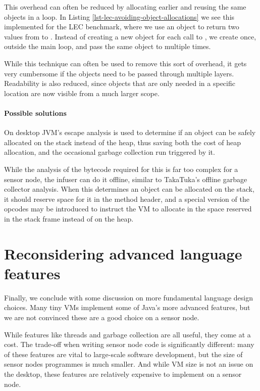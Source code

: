 This overhead can often be reduced by allocating earlier and reusing the same objects in a loop. In Listing \ref{lst-lec-avoiding-object-allocations} we see this implemented for the LEC benchmark, where we use an object to return two values from  to . Instead of creating a new object for each call to , we create  once, outside the main loop, and pass the same object to  multiple times.

While this technique can often be used to remove this sort of overhead, it gets very cumbersome if the objects need to be passed through multiple layers. Readability is also reduced, since objects that are only needed in a specific location are now visible from a much larger scope.

\paragraph{Possible solutions}
On desktop JVM's escape analysis \cite{Choi:1999uw, Goetz:2005uy} is used to determine if an object can be safely allocated on the stack instead of the heap, thus saving both the cost of heap allocation, and the occasional garbage collection run triggered by it.

While the analysis of the bytecode required for this is far too complex for a sensor node, the infuser can do it offline, similar to TakaTuka's offline garbage collector analysis. When this determines an object can be allocated on the stack, it should reserve space for it in the method header, and a special version of the  opcodes may be introduced to instruct the VM to allocate in the space reserved in the stack frame instead of on the heap.




\section{Reconsidering advanced language features}
\label{sec-advanced-features}
Finally, we conclude with some discussion on more fundamental language design choices. Many tiny VMs implement some of Java's more advanced features, but we are not convinced these are a good choice on a sensor node.

While features like threads and garbage collection are all useful, they come at a cost. The trade-off when writing sensor node code is significantly different: many of these features are vital to large-scale software development, but the size of sensor nodes programmes is much smaller. And while VM size is not an issue on the desktop, these features are relatively expensive to implement on a sensor node.


